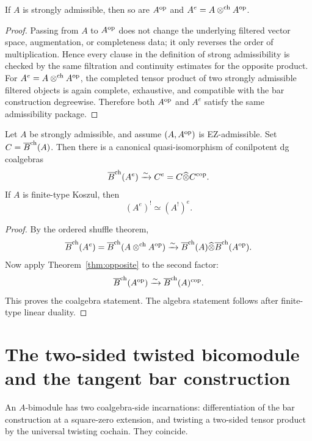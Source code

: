 \begin{lemma}
\ClaimStatusProvedHere
\label{lem:closure}
If $A$ is strongly admissible, then so are $A^{\mathrm{op}}$ and $A^e=A\mathbin{\otimes^{\mathrm{ch}}} A^{\mathrm{op}}$.
\end{lemma}

\begin{proof}
Passing from $A$ to $A^{\mathrm{op}}$ does not change the underlying filtered
vector space, augmentation, or completeness data; it only reverses the
order of multiplication.
Hence every clause in the definition of strong admissibility is checked
by the same filtration and continuity estimates for the opposite
product.
For $A^e=A\mathbin{\otimes^{\mathrm{ch}}} A^{\mathrm{op}}$, the completed tensor product of two
strongly admissible filtered objects is again complete, exhaustive, and
compatible with the bar construction degreewise.
Therefore both $A^{\mathrm{op}}$ and $A^e$ satisfy the same admissibility
package.
\end{proof}

\begin{corollary}
\ClaimStatusProvedHere
\label{cor:enveloping}
Let $A$ be strongly admissible, and assume $(A,A^{\mathrm{op}})$ is EZ-admissible. Set $C=\overline{B}^{\mathrm{ch}}(A)$.
Then there is a canonical quasi-isomorphism of conilpotent dg coalgebras
\[
\overline{B}^{\mathrm{ch}}(A^e)\xrightarrow{\sim} C^e=C\widehat\otimes C^{\mathrm{cop}}.
\]
If $A$ is finite-type Koszul, then
\[
(A^e)^!\simeq (A^!)^e.
\]
\end{corollary}

\begin{proof}
By the ordered shuffle theorem,
\[
\overline{B}^{\mathrm{ch}}(A^e)=\overline{B}^{\mathrm{ch}}(A\mathbin{\otimes^{\mathrm{ch}}} A^{\mathrm{op}})\xrightarrow{\sim}\overline{B}^{\mathrm{ch}}(A)\widehat\otimes \overline{B}^{\mathrm{ch}}(A^{\mathrm{op}}).
\]
Now apply Theorem~\ref{thm:opposite} to the second factor:
\[
\overline{B}^{\mathrm{ch}}(A^{\mathrm{op}})\xrightarrow{\sim}\overline{B}^{\mathrm{ch}}(A)^{\mathrm{cop}}.
\]
This proves the coalgebra statement. The algebra statement follows after finite-type linear duality.
\end{proof}

\section{The two-sided twisted bicomodule and the tangent bar construction}
\label{sec:tangent}

An $A$-bimodule has two coalgebra-side incarnations:
differentiation of the bar construction at a square-zero extension,
and twisting a two-sided tensor product by the universal twisting cochain.
They coincide.

